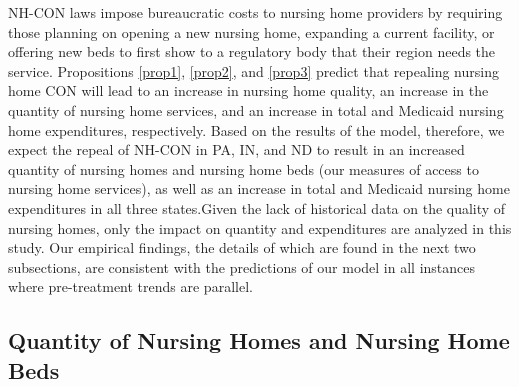 \documentclass[../Main.tex]{subfiles}
\begin{document}
NH-CON laws impose bureaucratic costs to nursing home providers by requiring those planning on opening a new nursing home, expanding a current facility, or offering new beds to first show to a regulatory body that their region needs the service.  Propositions \ref{prop1}, \ref{prop2}, and \ref{prop3} predict that repealing nursing home CON will lead to an increase in nursing home quality, an increase in the quantity of nursing home services, and an increase in total and Medicaid nursing home expenditures, respectively. Based on the results of the model, therefore, we expect the repeal of NH-CON in PA, IN, and ND to result in an increased quantity of nursing homes and nursing home beds (our measures of access to nursing home services), as well as an increase in total and Medicaid nursing home expenditures in all three states.Given the lack of historical data on the quality of nursing homes, only the impact on quantity and expenditures are analyzed in this study. Our empirical findings, the details of which are found in the next two subsections, are consistent with the predictions of our model in all instances where pre-treatment trends are parallel.

\subsection{Quantity of Nursing Homes and Nursing Home Beds}
\end{document}
